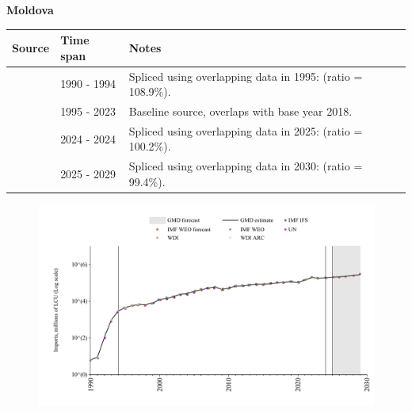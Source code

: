 \documentclass[12pt,a4paper,landscape]{article}
\begin{document}
\begin{adjustbox}{max totalsize={\paperwidth}{\paperheight},center}
\begin{minipage}[t][\textheight][t]{\textwidth}
\vspace*{0.5cm}
{}
\begin{center}
{\Large\bfseries Moldova}
\end{center}
\vspace{0.5cm}
\begin{table}[H]
\centering
\small
\begin{tabular}{|l|l|l|}
\hline
\textbf{Source} & \textbf{Time span} & \textbf{Notes} \\
\hline
\rowcolor{white}\cite{UN}& 1990 - 1994 &Spliced using overlapping data in 1995: (ratio = 108.9\%).\\
\rowcolor{lightgray}\cite{WDI}& 1995 - 2023 &Baseline source, overlaps with base year 2018.\\
\rowcolor{white}\cite{IMF_IFS}& 2024 - 2024 &Spliced using overlapping data in 2025: (ratio = 100.2\%).\\
\rowcolor{lightgray}\cite{IMF_WEO_forecast}& 2025 - 2029 &Spliced using overlapping data in 2030: (ratio = 99.4\%).\\
\hline
\end{tabular}
\end{table}
\begin{figure}[H]
\centering
\includegraphics[width=\textwidth,height=0.6\textheight,keepaspectratio]{graphs/MDA_imports.pdf}
\end{figure}
\end{minipage}
\end{adjustbox}
\end{document}
